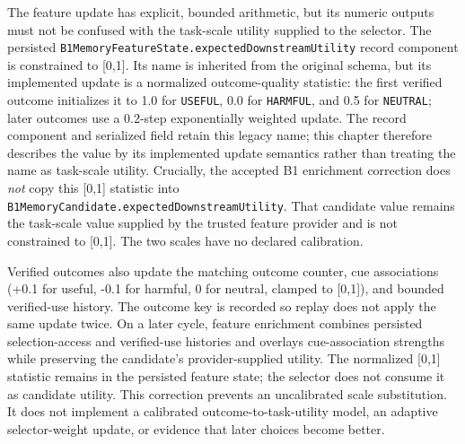 The feature update has explicit, bounded arithmetic, but its numeric outputs must not be confused with the task-scale utility supplied to the selector. The persisted \texttt{B1\allowbreak{}Memory\allowbreak{}Feature\allowbreak{}State.expected\allowbreak{}Downstream\allowbreak{}Utility} record component is constrained to [0,1]. Its name is inherited from the original schema, but its implemented update is a normalized outcome-quality statistic: the first verified outcome initializes it to 1.0 for \texttt{USEFUL}, 0.0 for \texttt{HARMFUL}, and 0.5 for \texttt{NEUTRAL}; later outcomes use a 0.2-step exponentially weighted update. The record component and serialized field retain this legacy name; this chapter therefore describes the value by its implemented update semantics rather than treating the name as task-scale utility. Crucially, the accepted B1 enrichment correction does \emph{not} copy this [0,1] statistic into \texttt{B1\allowbreak{}Memory\allowbreak{}Candidate.expected\allowbreak{}Downstream\allowbreak{}Utility}. That candidate value remains the task-scale value supplied by the trusted feature provider and is not constrained to [0,1]. The two scales have no declared calibration.

Verified outcomes also update the matching outcome counter, cue associations (+0.1 for useful, -0.1 for harmful, 0 for neutral, clamped to [0,1]), and bounded verified-use history. The outcome key is recorded so replay does not apply the same update twice. On a later cycle, feature enrichment combines persisted selection-access and verified-use histories and overlays cue-association strengths while preserving the candidate's provider-supplied utility. The normalized [0,1] statistic remains in the persisted feature state; the selector does not consume it as candidate utility. This correction prevents an uncalibrated scale substitution. It does not implement a calibrated outcome-to-task-utility model, an adaptive selector-weight update, or evidence that later choices become better.

